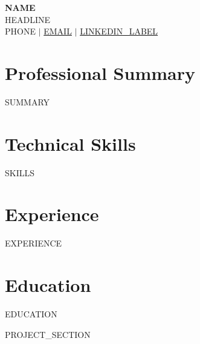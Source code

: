 \documentclass[letterpaper,10pt]{article}
\newcommand{\resumeSubHeadingListStart}{\begin{itemize}[leftmargin=0.15in, label={}]}
\newcommand{\resumeSubHeadingListEnd}{\end{itemize}}
\begin{document}
\begin{center}
    {\Huge \textbf{{{NAME}}}} \\ \vspace{2pt}
    \small {{HEADLINE}} \\ \vspace{3pt}
    \small {{PHONE}} \quad $|$ \quad \href{mailto:{{EMAIL}}}{{{EMAIL}}} \quad $|$ \quad
    \href{{{LINKEDIN}}}{{{LINKEDIN_LABEL}}}
\end{center}

\section{Professional Summary}
\small{{{SUMMARY}}}

\section{Technical Skills}
 \begin{itemize}[leftmargin=0.15in, label={}]
    \small{\item{
     {{SKILLS}}
    }}
 \end{itemize}

\section{Experience}
  \resumeSubHeadingListStart
    {{EXPERIENCE}}
  \resumeSubHeadingListEnd

\section{Education}
  \resumeSubHeadingListStart
    {{EDUCATION}}
  \resumeSubHeadingListEnd

{{PROJECT_SECTION}}

\end{document}
